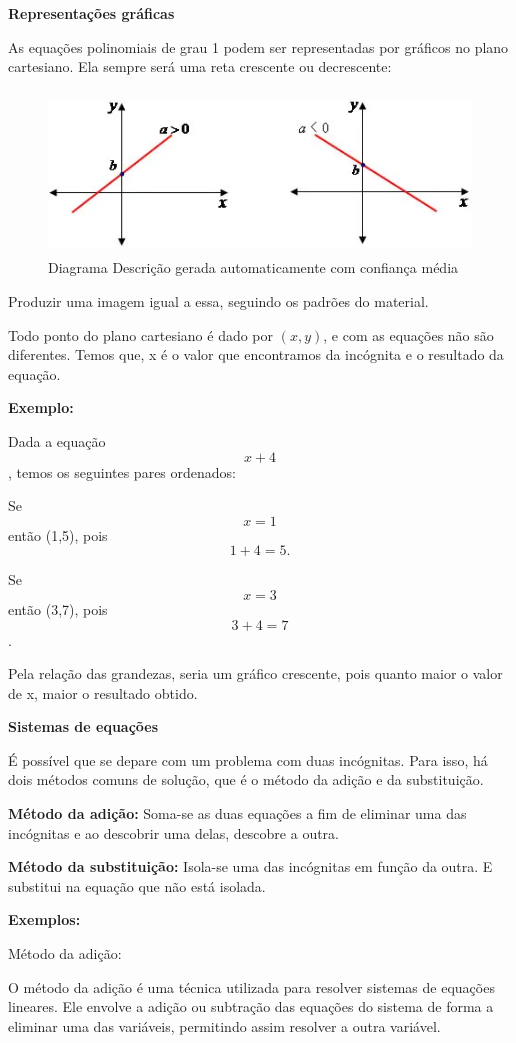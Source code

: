 \textbf{Representações gráficas}

As equações polinomiais de grau 1 podem ser representadas por gráficos
no plano cartesiano. Ela sempre será uma reta crescente ou decrescente:

\begin{figure}
\centering
\includegraphics[width=4.82292in,height=1.69792in]{./imgSAEB_7_MAT/media/image17.png}
\caption{Diagrama Descrição gerada automaticamente com confiança média}
\end{figure}

Produzir uma imagem igual a essa, seguindo os padrões do material.

Todo ponto do plano cartesiano é dado por \((x,y)\), e com as equações
não são diferentes. Temos que, x é o valor que encontramos da incógnita
e o resultado da equação.

\textbf{Exemplo:}

Dada a equação \[x + 4\], temos os seguintes pares ordenados:

Se \[x = 1\] então (1,5), pois \[1 + 4 = 5.\]

Se \[x = 3\] então (3,7), pois \[3 + 4 = 7\].

Pela relação das grandezas, seria um gráfico crescente, pois quanto
maior o valor de x, maior o resultado obtido.

\textbf{Sistemas de equações}

É possível que se depare com um problema com duas incógnitas. Para isso,
há dois métodos comuns de solução, que é o método da adição e da
substituição.

\textbf{Método da adição:} Soma-se as duas equações a fim de eliminar
uma das incógnitas e ao descobrir uma delas, descobre a outra.

\textbf{Método da substituição:} Isola-se uma das incógnitas em função
da outra. E substitui na equação que não está isolada.

\textbf{Exemplos:}

Método da adição:

O método da adição é uma técnica utilizada para resolver sistemas de
equações lineares. Ele envolve a adição ou subtração das equações do
sistema de forma a eliminar uma das variáveis, permitindo assim resolver
a outra variável.

